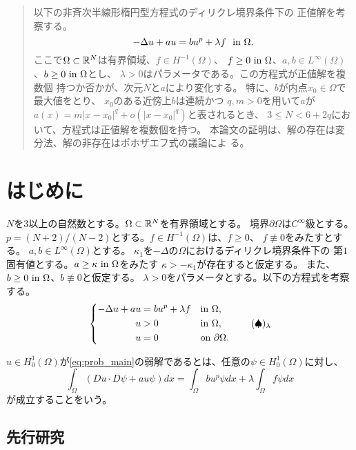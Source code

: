\begin{abstract}
 以下の非斉次半線形楕円型方程式のディリクレ境界条件下の
 正値解を考察する。
 \[
  -\Delta u + a u = b u^p + \lambda f \ \ \text{in}~ \Omega.
 \]
 ここで$\Omega \subset \mathbb{R}^N$は有界領域、$f \in H^{-1}(\Omega)$、
 $f \geq 0 ~\text{in}~ \Omega$、$a, b \in L^\infty(\Omega)$、$b \geq 0 ~\text{in}~
 \Omega$とし、
 $\lambda > 0$はパラメータである。この方程式が正値解を複数個
 持つか否かが、次元$N$と$a$により変化する。
 特に、$b$が内点$x_0 \in \Omega$で最大値をとり、
 $x_0$のある近傍上$b$は連続かつ
 $q, m > 0$を用いて$a$が
 $a(x) = m \lvert x - x_0 \rvert^{q} + o( \lvert x - x_0
 \rvert^{q})$と表されるとき、
 $3 \leq N < 6 + 2q$において、方程式は正値解を複数個を持つ。
 本論文の証明は、解の存在は変分法、解の非存在はポホザエフ式の議論によ
 る。
\end{abstract}

\section{はじめに}

$N$を$3$以上の自然数とする。$\Omega \subset \mathbb{R}^N$を有界領域とする。
境界$\partial \Omega$は$C^\infty$級とする。
$p = (N+2)/(N-2)$とする。$f \in H^{-1}(\Omega)$は、$f \geq 0$、
$f \not \equiv 0$をみたすとする。
$a, b \in L^\infty(\Omega)$とする。
$\kappa_1$を$-\Delta$の$\Omega$におけるディリクレ境界条件下の
第$1$固有値とする。$a \geq \kappa ~\text{in}~ \Omega$をみたす
$\kappa > - \kappa_1$が存在すると仮定する。
また、$b \geq 0 ~\text{in}~ \Omega$、$b \not \equiv 0$と仮定する。
$\lambda > 0$をパラメータとする。以下の方程式を考察する。
\begin{align}
 \left\{
 \begin{aligned}
  -\Delta u + a u &= b u^p + \lambda f  & &\text{in}~ \Omega,  \\
  u &> 0 & &\text{in}~ \Omega, \\
  u &= 0 & &\text{on}~ \partial\Omega.
 \end{aligned}
 \right. \tag*{$(\spadesuit)_\lambda$} \label{eq:prob_main}
\end{align}

$u \in H_0^1(\Omega)$が\ref{eq:prob_main}の弱解であるとは、任意の$\psi
\in H_0^1(\Omega)$に対し、
\[
 \int_\Omega \left( Du \cdot D\psi + a u \psi \right) dx = \int_\Omega
 b u^p \psi dx + \lambda \int_\Omega f \psi dx
\]
が成立することをいう。

\subsection{先行研究}

